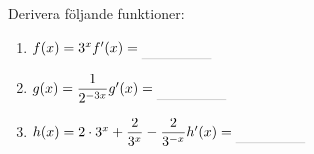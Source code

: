 \documentclass[a4paper, 12pt]{article}
\begin{document}
\begin{uppgifter}
    \label{upp:a^kx}
    Derivera följande funktioner:
    \begin{multicols}{3}
        \begin{enumerate}
            \item $f(x) = 3^x \\ f'(x) \ans$
            \item $g(x) = \dfrac{1}{2^{-3x}} \\ g'(x) \ans$
            \item $h(x) = 2\cdot 3^x + \dfrac 2{3^x} - \dfrac 2{3^{-x}} \\ h'(x) \ans$
        \end{enumerate}
    \end{multicols}
\end{uppgifter}

\newpage
\end{document}
